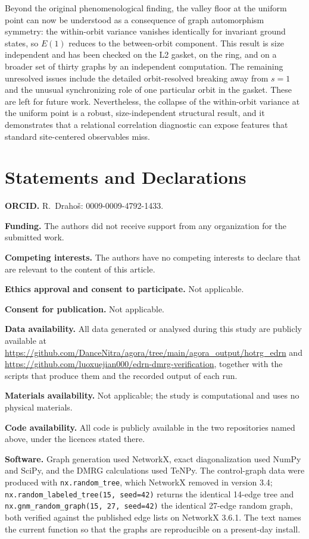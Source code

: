 \documentclass[pdflatex,sn-mathphys-num,iicol]{sn-jnl}
\begin{document}
Beyond the original phenomenological finding, the valley floor at the uniform point can now be understood as a consequence of graph automorphism symmetry: the within-orbit variance vanishes identically for invariant ground states, so $E(1)$ reduces to the between-orbit component. This result is size independent and has been checked on the L2 gasket, on the ring, and on a broader set of thirty graphs by an independent computation. The remaining unresolved issues include the detailed orbit-resolved breaking away from $s=1$ and the unusual synchronizing role of one particular orbit in the gasket. These are left for future work. Nevertheless, the collapse of the within-orbit variance at the uniform point is a robust, size-independent structural result, and it demonstrates that a relational correlation diagnostic can expose features that standard site-centered observables miss.

\section*{Statements and Declarations}

\textbf{ORCID.} R.~Draho\v{s}: 0009-0009-4792-1433.

\textbf{Funding.} The authors did not receive support from any organization for the submitted work.

\textbf{Competing interests.} The authors have no competing interests to declare that are relevant to the content of this article.

\textbf{Ethics approval and consent to participate.} Not applicable.

\textbf{Consent for publication.} Not applicable.

\textbf{Data availability.} All data generated or analysed during this study are publicly available at \url{https://github.com/DanceNitra/agora/tree/main/agora_output/hotrg_edrn} and \url{https://github.com/luoxuejian000/edrn-dmrg-verification}, together with the scripts that produce them and the recorded output of each run.

\textbf{Materials availability.} Not applicable; the study is computational and uses no physical materials.

\textbf{Code availability.} All code is publicly available in the two repositories named above, under the licences stated there.

\textbf{Software.} Graph generation used NetworkX, exact diagonalization used NumPy and SciPy, and the DMRG calculations used TeNPy. The control-graph data were produced with \texttt{nx.random\_tree}, which NetworkX removed in version 3.4; \texttt{nx.random\_labeled\_tree(15, seed=42)} returns the identical 14-edge tree and \texttt{nx.gnm\_random\_graph(15, 27, seed=42)} the identical 27-edge random graph, both verified against the published edge lists on NetworkX 3.6.1. The text names the current function so that the graphs are reproducible on a present-day install.
\end{document}
